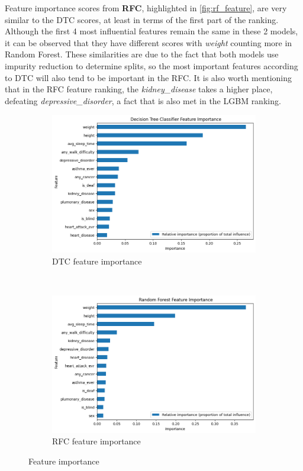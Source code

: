 \documentclass[runningheads]{llncs}
\begin{document}
Feature importance scores from \textbf{RFC}, highlighted in \autoref{fig:rf_feature}, are very similar to the DTC scores, at least in terms of the first part of the ranking. Although the first 4 most influential features remain the same in these 2 models, it can be observed that they have different scores with \textit{weight} counting more in Random Forest. These similarities are due to the fact that both models use impurity reduction to determine splits, so the most important features according to DTC will also tend to be important in the RFC. It is also worth mentioning that in the RFC feature ranking, the \textit{kidney\_disease} takes a higher place, defeating \textit{depressive\_disorder}, a fact that is also met in the LGBM ranking.

\begin{figure}[htbp]
    \centering
    \begin{subfigure}[t]{0.48\textwidth}
        \centering
        \includegraphics[width=0.99\linewidth]{images/DT_fi.png}
        \caption{DTC feature importance}
        \label{fig:DT_feature}
    \end{subfigure}%
    ~ 
    \begin{subfigure}[t]{0.48\textwidth}
        \centering
        \includegraphics[width=0.99\linewidth]{images/rf_fi.png}
        \caption{RFC feature importance}
        \label{fig:rf_feature}
    \end{subfigure}
    \caption{Feature importance}
\end{figure}
\end{document}
